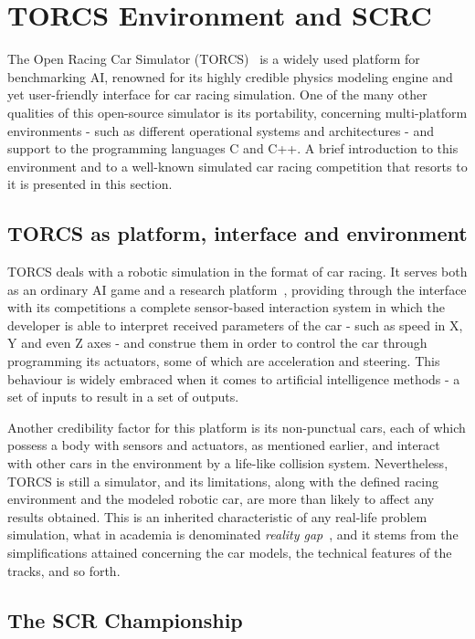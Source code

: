 \section{\textbf{TORCS Environment and SCRC}} \label{sec:Environment}

	The Open Racing Car Simulator (TORCS)~\cite{TORCS} is a widely used platform for benchmarking AI, renowned for
	its	highly credible physics modeling engine and yet user-friendly interface for car racing simulation. One of
	the	many other qualities of this open-source simulator is its portability, concerning multi-platform environments
	- such as different operational systems and architectures - and support to the programming languages C and C++. A
	brief introduction to this environment and to a well-known simulated car racing competition that resorts to it is
	presented in this section.

\subsection{TORCS as platform, interface and environment} \label{subsec:TORCS}
	
	TORCS deals with a robotic simulation in the format of car racing. It serves both as an ordinary AI game and a
	research platform~\cite{2009}, providing through the interface with its competitions a complete sensor-based
	interaction system in which the developer is able to interpret received parameters of the car - such as speed in
	X, Y and even Z axes - and construe them in order to control the car through programming its actuators, some of
	which are acceleration and steering. This behaviour is widely embraced when it comes to artificial intelligence
	methods - a set of inputs to result in a set of outputs.
	
	Another credibility factor for this platform is its non-punctual cars, each of which possess a body with sensors
	and actuators, as mentioned earlier, and interact with other cars in the environment by a life-like collision
	system. Nevertheless, TORCS is still a simulator, and its limitations, along with the defined racing environment
	and the modeled robotic car, are more than likely to affect any results obtained. This is an inherited
	characteristic of any real-life problem simulation, what in academia is denominated \emph{reality gap}~\cite{RG}, and it stems from the simplifications attained concerning the car models, the technical features of the tracks,
	and so forth.

\subsection{The SCR Championship} \label{subsec:SCRC}

